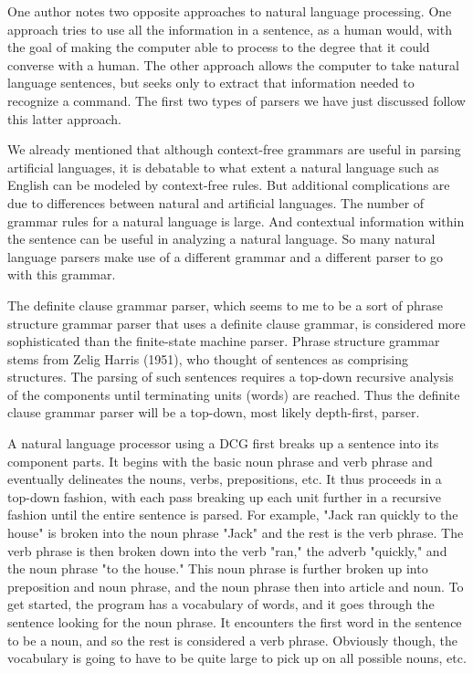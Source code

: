 One author notes two opposite approaches to natural language processing. One approach tries to use all the information in a sentence, as a human would, with the goal of making the computer able to process to the degree that it could converse with a human. The other approach allows the computer to take natural language sentences, but seeks only to extract that information needed to recognize a command. The first two types of parsers we have just discussed follow this latter approach.

We already mentioned that although context-free grammars are useful in parsing artificial languages, it is debatable to what extent a natural language such as English can be modeled by context-free rules. But additional complications are due to differences between natural and artificial languages. The number of grammar rules for a natural language is large. And contextual information within the sentence can be useful in analyzing a natural language. So many natural language parsers make use of a different grammar and a different parser to go with this grammar.

The definite clause grammar parser, which seems to me to be a sort of phrase structure grammar parser that uses a definite clause grammar, is considered more sophisticated than the finite-state machine parser. Phrase structure grammar stems from Zelig Harris (1951), who thought of sentences as comprising structures. The parsing of such sentences requires a top-down recursive analysis of the components until terminating units (words) are reached. Thus the definite clause grammar parser will be a top-down, most likely depth-first, parser.

A natural language processor using a DCG first breaks up a sentence into its component parts. It begins with the basic noun phrase and verb phrase and eventually delineates the nouns, verbs, prepositions, etc. It thus proceeds in a top-down fashion, with each pass breaking up each unit further in a recursive fashion until the entire sentence is parsed. For example, "Jack ran quickly to the house" is broken into the noun phrase "Jack" and the rest is the verb phrase. The verb phrase is then broken down into the verb "ran," the adverb "quickly," and the noun phrase "to the house." This noun phrase is further broken up into preposition and noun phrase, and the noun phrase then into article and noun. To get started, the program has a vocabulary of words, and it goes through the sentence looking for the noun phrase. It encounters the first word in the sentence to be a noun, and so the rest is considered a verb phrase. Obviously though, the vocabulary is going to have to be quite large to pick up on all possible nouns, etc.

